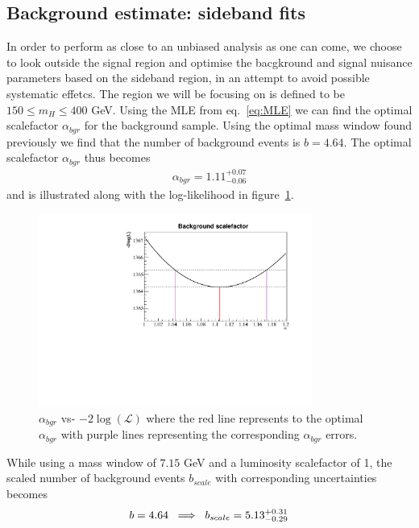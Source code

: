 \documentclass[12pt,a4paper]{amsart}
\begin{document}
\subsection{Background estimate: sideband fits} \label{subsec:Analysis-(background estimate:sideband fits)}
In order to perform as close to an unbiased analysis as one can come, we choose to look outside the signal region and optimise the bacgkround and signal nuisance parameters based on the sideband region, in an attempt to avoid possible systematic effetcs. The region we will be focusing on is defined to be $150\leq m_H \leq 400$ GeV. Using the MLE from eq.~\eqref{eq:MLE} we can find the optimal scalefactor $\alpha_{bgr}$ for the background sample. Using the optimal mass window found previously we find that the number of background events is $b = 4.64$. The optimal scalefactor $\alpha_{bgr}$ thus becomes 
\begin{align*}
\alpha_{bgr} = 1.11^{+0.07}_{-0.06}
\end{align*}
and is illustrated along with the log-likelihood in figure~\ref{fig:background_scalefactor}.
\begin{figure}
\centering
\includegraphics[width=0.8\textwidth]{../data/11_2/SideBand_fit.pdf}
\caption{$\alpha_{bgr}$ vs- $-2\log(\mathcal{L})$ where the red line represents to the optimal $\alpha_{bgr}$ with purple lines representing the corresponding $\alpha_{bgr}$ errors.}
\label{fig:background_scalefactor}
\end{figure}
While using a mass window of $7.15$ GeV and a luminosity scalefactor of 1, the scaled number of background events $b_{scale}$ with corresponding uncertainties becomes
\begin{align*}
b = 4.64 \hspace{.2cm }\Longrightarrow \hspace{.2cm} b_{scale} = 5.13^{+0.31}_{-0.29}
\end{align*}
\end{document}
